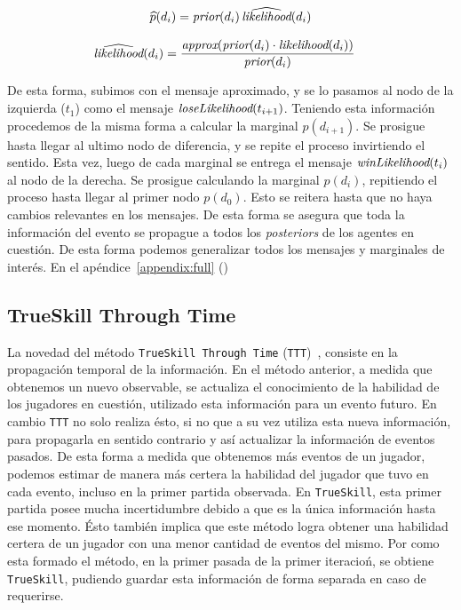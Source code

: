 \documentclass[11pt,twoside,spanish]{report} %
\begin{document}
\begin{equation}
\widehat{p}(d_i) = \emph{prior}(d_i) \, \widehat{\emph{likelihood}}(d_i)
\end{equation}

\begin{equation}
\begin{split}
\widehat{\emph{likelihood}}(d_i) &= \frac{\emph{approx}(\emph{prior}(d_i) \cdot \emph{likelihood}(d_i))}{ \emph{prior}(d_i)}
\end{split}
\end{equation}


De esta forma, subimos con el mensaje aproximado, y se lo pasamos al nodo de la izquierda ($t_1$) como el mensaje $\emph{loseLikelihood}(t_{i+1})$.
Teniendo esta informaci\'on procedemos de la misma forma a calcular la marginal $p(d_{i+1})$.
Se prosigue hasta llegar al ultimo nodo de diferencia, y se repite el proceso invirtiendo el sentido.
Esta vez, luego de cada marginal se entrega el mensaje $\emph{winLikelihood}(t_{i})$ al nodo de la derecha.
Se prosigue calculando la marginal $p(d_{i})$, repitiendo el proceso hasta llegar al primer nodo $p(d_{0})$.
Esto se reitera hasta que no haya cambios relevantes en los mensajes.
De esta forma se asegura que toda la informaci\'on del evento se propague a todos los \textit{posteriors} de los agentes en cuesti\'on.
De esta forma podemos generalizar todos los mensajes y marginales de inter\'es.
En el ap\'endice~\ref{appendix:full} ()





\subsection{TrueSkill Through Time}


La novedad del m\'etodo  \texttt{TrueSkill Through Time} (\texttt{TTT})~\cite{Dangauthier2007}, consiste en la propagaci\'on temporal de la informaci\'on.
En el m\'etodo anterior, a medida que obtenemos un nuevo observable, se actualiza el conocimiento de la habilidad de los jugadores en cuesti\'on, utilizado esta informaci\'on para un evento futuro.
En cambio \texttt{TTT} no solo realiza \'esto, si no que a su vez utiliza esta nueva informaci\'on, para propagarla en sentido contrario y as\'i actualizar la informaci\'on de eventos pasados.
De esta forma a medida que obtenemos m\'as eventos de un jugador, podemos estimar de manera m\'as certera la habilidad del jugador  que tuvo en cada evento, incluso en la primer partida observada.
En \texttt{TrueSkill}, esta primer partida posee mucha incertidumbre debido a que es la \'unica informaci\'on hasta ese momento.
\'Esto tambi\'en implica que este m\'etodo logra  obtener una habilidad certera de un jugador con una menor cantidad de eventos del mismo.
Por como esta formado el m\'etodo, en la primer pasada de la primer iteracio\'n, se obtiene \texttt{TrueSkill}, pudiendo guardar esta informaci\'on de forma separada en caso de requerirse.
\end{document}
